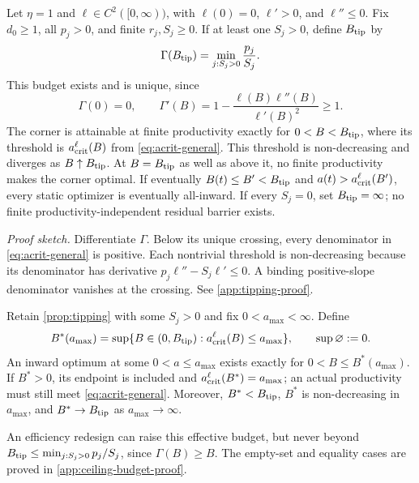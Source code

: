 \begin{proposition}
\label{prop:tipping}
Let $\eta=1$ and $\ell\in C^2([0,\infty))$, with $\ell(0)=0$,
$\ell'>0$, and $\ell''\leq0$. Fix $d_0\geq1$, all $p_j>0$, and finite
$r_j,S_j\geq0$. If at least one $S_j>0$, define $B_{\rm tip}$ by
\begin{equation}
 \Gamma(B_{\rm tip})=\min_{j:S_j>0}\frac{p_j}{S_j}.
 \label{eq:tipping-budget}
\end{equation}
This budget exists and is unique, since
\begin{equation}
 \Gamma(0)=0,\qquad
 \Gamma'(B)=1-\frac{\ell(B)\ell''(B)}{\ell'(B)^2}\geq1.
 \label{eq:gamma-monotone}
\end{equation}
The corner is attainable at finite productivity exactly for
$0<B<B_{\rm tip}$, where its threshold is
$a_{\rm crit}^{\ell}(B)$ from \cref{eq:acrit-general}.
This threshold is non-decreasing and diverges as
$B\uparrow B_{\rm tip}$. At $B=B_{\rm tip}$ as well as above it,
no finite productivity makes the corner optimal.
If eventually $B(t)\leq B'<B_{\rm tip}$ and
$a(t)>a_{\rm crit}^{\ell}(B')$, every static optimizer is eventually
all-inward. If every $S_j=0$, set
$B_{\rm tip}=\infty$; no finite productivity-independent residual
barrier exists.
\end{proposition}
\noindent\emph{Proof sketch.}
Differentiate $\Gamma$. Below its unique crossing, every denominator
in \cref{eq:acrit-general} is positive. Each nontrivial threshold is
non-decreasing because its denominator has derivative
$p_j\ell''-S_j\ell'\leq0$. A binding positive-slope denominator
vanishes at the crossing. See \cref{app:tipping-proof}.

\begin{corollary}
\label{cor:ceiling-budget}
Retain \cref{prop:tipping} with some $S_j>0$ and fix
$0<a_{\max}<\infty$. Define
\begin{equation}
 B^*(a_{\max})=\sup\{B\in(0,B_{\rm tip}):
                     a_{\rm crit}^{\ell}(B)\leq a_{\max}\},
 \qquad \sup\varnothing:=0.
 \label{eq:ceiling-budget}
\end{equation}
An inward optimum at some $0<a\leq a_{\max}$ exists exactly for
$0<B\leq B^*(a_{\max})$. If $B^*>0$, its endpoint is included and
$a_{\rm crit}^{\ell}(B^*)=a_{\max}$; an actual productivity must still
meet \cref{eq:acrit-general}. Moreover, $B^*<B_{\rm tip}$,
$B^*$ is non-decreasing in $a_{\max}$, and $B^*\to B_{\rm tip}$ as
$a_{\max}\to\infty$.
\end{corollary}
An efficiency redesign can raise this effective budget, but never beyond
$B_{\rm tip}\leq\min_{j:S_j>0}p_j/S_j$, since $\Gamma(B)\geq B$.
The empty-set and equality cases are proved in \cref{app:ceiling-budget-proof}.

